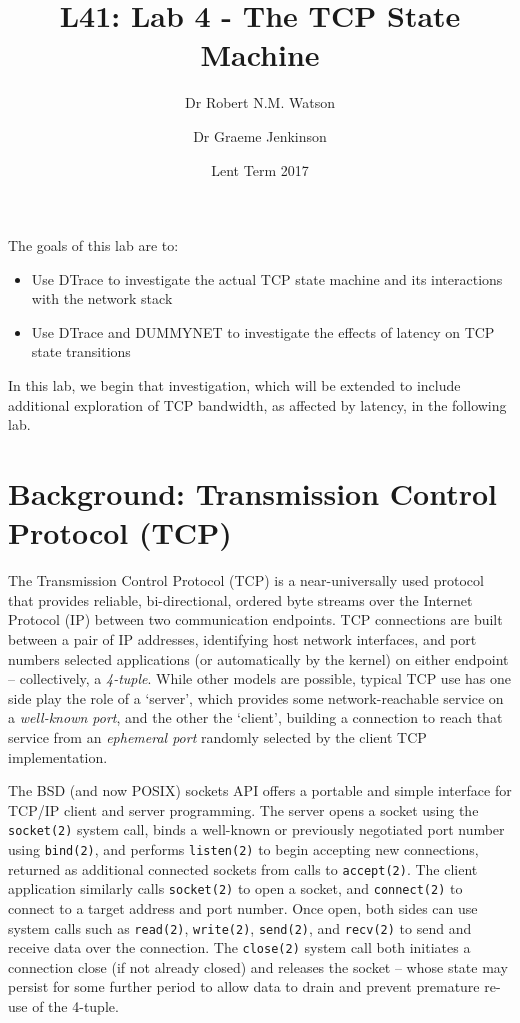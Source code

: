 \documentclass[a4paper,10pt]{article}
\begin{document}
\title{L41: Lab 4 - The TCP State Machine}
\author{Dr Robert N.M. Watson \and Dr Graeme Jenkinson}
\date{Lent Term 2017}
\maketitle

\noindent
The goals of this lab are to:

\begin{itemize}
\item Use DTrace to investigate the actual TCP state machine and its
  interactions with the network stack
\item Use DTrace and DUMMYNET to investigate the effects of latency on TCP
  state transitions
\end{itemize}

\noindent
In this lab, we begin that investigation, which will be extended to include
additional exploration of TCP bandwidth, as affected by latency, in the
following lab.

\section*{Background: Transmission Control Protocol (TCP)}

The Transmission Control Protocol (TCP) is a near-universally used protocol
that provides reliable, bi-directional, ordered byte streams over the Internet
Protocol (IP) between two communication endpoints.
TCP connections are built between a pair of IP addresses, identifying host
network interfaces, and port numbers selected applications (or automatically
by the kernel) on either endpoint -- collectively, a \textit{4-tuple}.
While other models are possible, typical TCP use has one side play the role of
a `server', which provides some network-reachable service on a
\textit{well-known port}, and the other the `client', building a connection to
reach that service from an \textit{ephemeral port} randomly selected by the
client TCP implementation.

The BSD (and now POSIX) sockets API offers a portable and simple interface for
TCP/IP client and server programming.
The server opens a socket using the \texttt{socket(2)} system call, binds a
well-known or previously negotiated port number using \texttt{bind(2)}, and
performs \texttt{listen(2)} to begin accepting new connections, returned as
additional connected sockets from calls to \texttt{accept(2)}.
The client application similarly calls \texttt{socket(2)} to open a socket,
and \texttt{connect(2)} to connect to a target address and port number.
Once open, both sides can use system calls such as \texttt{read(2)},
\texttt{write(2)}, \texttt{send(2)}, and \texttt{recv(2)} to send and receive
data over the connection.
The \texttt{close(2)} system call both initiates a connection close (if not
already closed) and releases the socket -- whose state may persist for some
further period to allow data to drain and prevent premature re-use of the
4-tuple.
\end{document}
